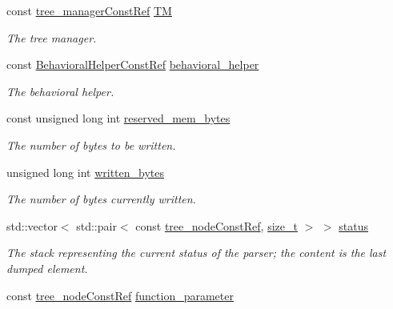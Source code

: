 \begin{DoxyCompactItemize}
\item 
const \hyperlink{tree__manager_8hpp_a792e3f1f892d7d997a8d8a4a12e39346}{tree\+\_\+manager\+Const\+Ref} \hyperlink{classMemoryInitializationWriterBase_ad7639a9140b8d5c42c2c0c4255ad4cbf}{TM}
\begin{DoxyCompactList}\small\item\em The tree manager. \end{DoxyCompactList}\item 
const \hyperlink{behavioral__helper_8hpp_aae973b54cac87eef3b27442aa3e1e425}{Behavioral\+Helper\+Const\+Ref} \hyperlink{classMemoryInitializationWriterBase_ae5f60dc91641447c00b023836743b6b3}{behavioral\+\_\+helper}
\begin{DoxyCompactList}\small\item\em The behavioral helper. \end{DoxyCompactList}\item 
const unsigned long int \hyperlink{classMemoryInitializationWriterBase_ac424618ba0c88d441a905b6cbf891b65}{reserved\+\_\+mem\+\_\+bytes}
\begin{DoxyCompactList}\small\item\em The number of bytes to be written. \end{DoxyCompactList}\item 
unsigned long int \hyperlink{classMemoryInitializationWriterBase_ad9086045443d3ea69d54c5ec9d10fd0b}{written\+\_\+bytes}
\begin{DoxyCompactList}\small\item\em The number of bytes currently written. \end{DoxyCompactList}\item 
std\+::vector$<$ std\+::pair$<$ const \hyperlink{tree__node_8hpp_a3cf5d02292c940f3892425a5b5fdec3c}{tree\+\_\+node\+Const\+Ref}, \hyperlink{tutorial__fpt__2017_2intro_2sixth_2test_8c_a7c94ea6f8948649f8d181ae55911eeaf}{size\+\_\+t} $>$ $>$ \hyperlink{classMemoryInitializationWriterBase_a4cc071f08a35090c72bedcf1e847c9ce}{status}
\begin{DoxyCompactList}\small\item\em The stack representing the current status of the parser; the content is the last dumped element. \end{DoxyCompactList}\item 
const \hyperlink{tree__node_8hpp_a3cf5d02292c940f3892425a5b5fdec3c}{tree\+\_\+node\+Const\+Ref} \hyperlink{classMemoryInitializationWriterBase_a2bdd8c25a0b756f6290cb48a6b9d0303}{function\+\_\+parameter}

\end{DoxyCompactItemize}
